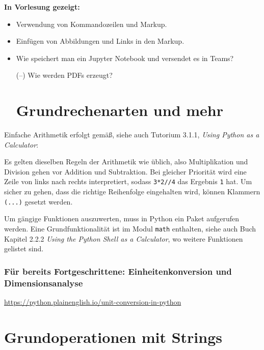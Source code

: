 

\noindent
\textbf{In Vorlesung gezeigt:}
\begin{itemize}
\item Verwendung von Kommandozeilen und Markup.
\item Einfügen von Abbildungen und Links in den Markup. 
\item Wie speichert man  ein Jupyter Notebook und versendet es in Teams?
\item[(--)] Wie werden PDFs erzeugt?



\section{Grundrechenarten und mehr}
\end{itemize}

Einfache Arithmetik erfolgt gemäß, siehe auch Tutorium 3.1.1, \textit{Using Python as a Calculator}:


Es gelten dieselben Regeln der Arithmetik wie üblich, also Multiplikation und Division gehen vor Addition und Subtraktion. Bei gleicher Priorität wird eine Zeile von links nach rechts interpretiert, sodass \texttt{3*2//4} das Ergebnis \texttt{1} hat. Um sicher zu gehen, dass die richtige Reihenfolge eingehalten wird, können Klammern \texttt{(...)} gesetzt werden. 

Um gängige Funktionen auszuwerten, muss in Python ein Paket aufgerufen werden. Eine Grundfunktionalität ist im Modul \texttt{math} enthalten, siehe auch Buch Kapitel 2.2.2 \textit{Using the Python Shell as a Calculator}, wo weitere Funktionen gelistet sind. 



\noindent
\subsubsection{Für bereits Fortgeschrittene: Einheitenkonversion und Dimensionsanalyse} 

\href{https://python.plainenglish.io/unit-conversion-in-python-3ee480d4b19c}{https://python.plainenglish.io/unit-conversion-in-python}

\section{Grundoperationen mit Strings}

